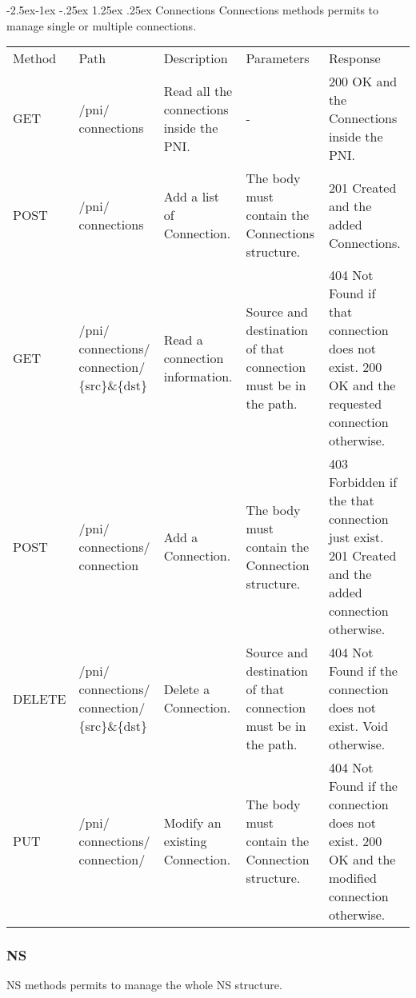 \documentclass[11pt, english]{article}
\makeatletter
\renewcommand\paragraph{\@startsection{paragraph}{4}{\z@}%
            {-2.5ex\@plus -1ex \@minus -.25ex}%
            {1.25ex \@plus .25ex}%
            {\normalfont\normalsize\bfseries}}
\makeatother
\begin{document}
\paragraph{Connections}
Connections methods permits to manage single or multiple connections. \\

\begin{tabular}{ |p{2cm}|m{3cm}|p{3cm}|p{3cm}|p{4cm}| }
    \hline
    \rowcolor{black} \multicolumn{5}{|c|}{\textcolor{white}{Connections}} \\
    \hline
    \rowcolor{Gray}
    Method & Path & Description & Parameters & Response \\
    \hline
    GET   & /pni/ connections & Read all the connections inside the PNI. & - & 200 OK and the Connections inside the PNI. \\
    \hline
    POST & /pni/ connections & Add a list of Connection. & The body must contain the Connections structure. & 201 Created and the added Connections. \\
    \hline
    GET & /pni/ connections/ connection/ \{src\}\&\{dst\} & Read a connection information. & Source and destination of that connection must be in the path. & 404 Not Found if that connection does not exist. 200 OK and the requested connection otherwise. \\
    \hline
    POST & /pni/ connections/ connection & Add a Connection. & The body must contain the Connection structure. & 403 Forbidden if the that connection just exist. 201 Created and the added connection otherwise. \\
    \hline
    DELETE & /pni/ connections/ connection/ \{src\}\&\{dst\} & Delete a Connection. & Source and destination of that connection must be in the path. & 404 Not Found if the connection does not exist. Void otherwise. \\
    \hline
    PUT & /pni/ connections/ connection/ & Modify an existing Connection. & The body must contain the Connection structure. & 404 Not Found if the connection does not exist. 200 OK and the modified connection otherwise. \\
    \hline
\end{tabular}

\newpage
\subsubsection{NS}
NS methods permits to manage the whole NS structure. \\
\end{document}
